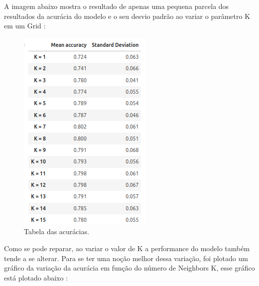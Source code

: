 \documentclass{article} %
\begin{document}
A imagem abaixo mostra o resultado de apenas uma pequena parcela dos resultados da acurácia do modelo e o seu desvio padrão ao variar o parâmetro K em um Grid : 

\vspace{1cm}

\begin{figure}[h] %
    \centering %
    \includegraphics[width=0.5\linewidth]{table_k.png} %
    \caption{Tabela das acurácias.} %
    \label{fig:exemplo} %
\end{figure}

\vspace{1cm}

Como se pode reparar, ao variar o valor de K a performance do modelo também tende a se alterar. Para se ter uma noção melhor dessa variação, foi plotado um gráfico da variação da acurácia em função do número de Neighbors K, esse gráfico está plotado abaixo :

\vspace{1cm}
\end{document}
